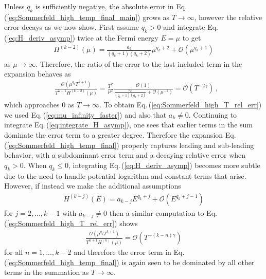 \documentclass[sn-mathphys,Numbered]{sn-jnl}
\newcommand{\req}[1]{Eq.\,(\ref{#1})}
\begin{document}
Unless $q_k$ is sufficiently negative, the absolute error in \req{eq:Sommerfeld_high_temp_final_main} grows as $T\to\infty$, however the relative error decays as we now show. First assume $q_k>0$ and integrate \req{eq:H_deriv_asymp} twice at the Fermi energy $E=\mu$ to get
\begin{align}\label{eq:integrate_H_asymp}
 H^{(k-2)}(\mu)=\frac{a_k}{(q_k+1)(q_k+2)}\mu^{q_k+2}+\mathcal{O}(\mu^{q_k+1})
\end{align}
as $\mu\to\infty$. Therefore, the ratio of the error to the last included term in the expansion behaves as
\begin{align}\label{eq:Sommerfeld_high_T_rel_err}
&\frac{\mathcal{O}(\mu^{q_k}T^{k+1})}{ T^{k-1} H^{(k-2)}(\mu)}=\frac{T^2}{\mu^2}\frac{\mathcal{O}(1)}{ \frac{a_k}{(q_k+1)(q_k+2)}+\mathcal{O}(\mu^{-1})}= \mathcal{O}(T^{-2\gamma})\,,
\end{align}
which approaches $0$ as $T\to \infty$. To obtain \req{eq:Sommerfeld_high_T_rel_err} we used \req{eq:mu_infinity_faster} and also that $a_k\neq 0$. Continuing to integrate \req{eq:integrate_H_asymp}, one sees that earlier terms in the sum dominate the error term to a greater degree. Therefore the expansion \req{eq:Sommerfeld_high_temp_final} properly captures leading and sub-leading behavior, with a subdominant error term and a decaying relative error when $q_k>0$. When $q_k\leq 0$, integrating \req{eq:H_deriv_asymp} becomes more subtle due to the need to handle potential logarithm and constant terms that arise. However, if instead we make the additional assumptions 
\begin{align}
H^{(k-j)}(E)=a_{k-j} E^{q_k+j} +\mathcal{O}(E^{q_k+j-1})
\end{align}
for $j=2,...,k-1$ with $a_{k-j}\neq 0$ then a similar computation to \req{eq:Sommerfeld_high_T_rel_err} shows
\begin{align}
 \frac{\mathcal{O}(\mu^{q_k}T^{k+1})}{T^{n+1}H^{(n)}(\mu)}= \mathcal{O}(T^{-(k-n)\gamma})
\end{align}
for all $n=1,...,k-2$ and therefore the error term in \req{eq:Sommerfeld_high_temp_final} is again seen to be dominated by all other terms in the summation as $T\to\infty$. 
\end{document}
